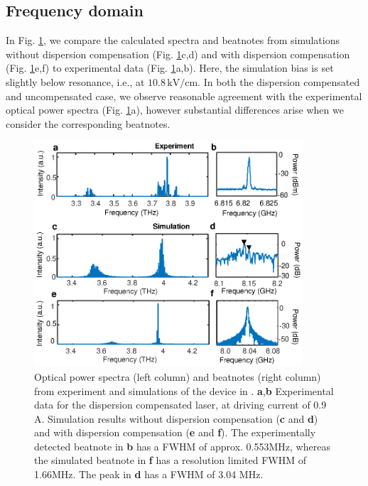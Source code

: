\documentclass[10pt,letterpaper]{article}%
\begin{document}
\subsection{Frequency domain}

In Fig. \ref{fig:img05}, we compare the calculated spectra and beatnotes from
simulations without dispersion compensation (Fig. \ref{fig:img05}c,d) and with
dispersion compensation (Fig. \ref{fig:img05}e,f) to experimental data (Fig.
\ref{fig:img05}a,b). Here, the simulation bias is set slightly below
resonance, i.e., at $10.8{\,}\mathrm{kV}/\mathrm{cm}$. In both the dispersion
compensated and uncompensated case, we observe reasonable agreement
with the experimental optical power spectra (Fig. \ref{fig:img05}a), however
substantial differences arise when we consider the corresponding
beatnotes.\begin{figure}[h]
\begin{center}
\includegraphics[width=10cm]{figs/SPECTRA_EXPERIMENT.eps}
\end{center}
\caption{ Optical power spectra (left column) and beatnotes (right column)
from experiment and simulations of the device in \cite{burghoff2014terahertz}.
\textbf{a},\textbf{b} Experimental data for the dispersion compensated laser,
at driving current of $0.9$ A. Simulation results without dispersion
compensation (\textbf{c} and \textbf{d}) and with dispersion compensation
(\textbf{e} and \textbf{f}). The experimentally detected beatnote in
\textbf{b} has a FWHM of approx. 0.553MHz, whereas the simulated beatnote in
\textbf{f} has a resolution limited FWHM of 1.66MHz. The peak in \textbf{d}
has a FWHM of 3.04 MHz.}%
\label{fig:img05}%
\end{figure}
\end{document}
